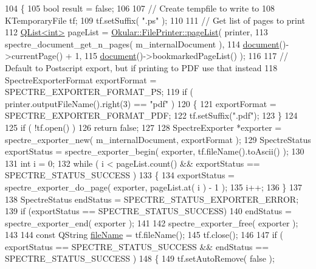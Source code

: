 \begin{DoxyCode}
104 \{
105     \textcolor{keywordtype}{bool} result = \textcolor{keyword}{false};
106 
107     \textcolor{comment}{// Create tempfile to write to}
108     KTemporaryFile tf;
109     tf.setSuffix( \textcolor{stringliteral}{".ps"} );
110 
111     \textcolor{comment}{// Get list of pages to print}
112     \hyperlink{classQList}{QList<int>} pageList = \hyperlink{classOkular_1_1FilePrinter_aed485e5e3fbe591b16e15915e318a1b7}{Okular::FilePrinter::pageList}( printer,
113                                                spectre\_document\_get\_n\_pages( m\_internalDocument ),
114                                                \hyperlink{classOkular_1_1Generator_a4248672ef04e62660d51f16c0a862bbe}{document}()->currentPage() + 1,
115                                                \hyperlink{classOkular_1_1Generator_a4248672ef04e62660d51f16c0a862bbe}{document}()->bookmarkedPageList() );
116 
117     \textcolor{comment}{// Default to Postscript export, but if printing to PDF use that instead}
118     SpectreExporterFormat exportFormat = SPECTRE\_EXPORTER\_FORMAT\_PS;
119     \textcolor{keywordflow}{if} ( printer.outputFileName().right(3) == \textcolor{stringliteral}{"pdf"} )
120     \{
121         exportFormat = SPECTRE\_EXPORTER\_FORMAT\_PDF;
122         tf.setSuffix(\textcolor{stringliteral}{".pdf"});
123     \}
124 
125     \textcolor{keywordflow}{if} ( !tf.open() )
126         \textcolor{keywordflow}{return} \textcolor{keyword}{false};
127 
128     SpectreExporter *exporter = spectre\_exporter\_new( m\_internalDocument, exportFormat );
129     SpectreStatus exportStatus = spectre\_exporter\_begin( exporter, tf.fileName().toAscii() );
130 
131     \textcolor{keywordtype}{int} i = 0;
132     \textcolor{keywordflow}{while} ( i < pageList.count() && exportStatus == SPECTRE\_STATUS\_SUCCESS )
133     \{
134         exportStatus = spectre\_exporter\_do\_page( exporter, pageList.at( i ) - 1 );
135         i++;
136     \}
137 
138     SpectreStatus endStatus = SPECTRE\_STATUS\_EXPORTER\_ERROR;
139     \textcolor{keywordflow}{if} (exportStatus == SPECTRE\_STATUS\_SUCCESS)
140         endStatus = spectre\_exporter\_end( exporter );
141 
142     spectre\_exporter\_free( exporter );
143 
144     \textcolor{keyword}{const} QString \hyperlink{classGSGenerator_abe1f26c04df57978c5c34a1ef2e58622}{fileName} = tf.fileName();
145     tf.close();
146 
147     \textcolor{keywordflow}{if} ( exportStatus == SPECTRE\_STATUS\_SUCCESS && endStatus == SPECTRE\_STATUS\_SUCCESS )
148     \{
149         tf.setAutoRemove( \textcolor{keyword}{false} );

\end{DoxyCode}
